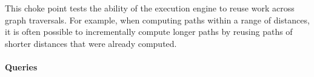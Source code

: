 
This choke point tests the ability of the execution engine to reuse work across
graph traversals. For example, when computing paths within a range of distances,
it is often possible to incrementally compute longer paths by reusing paths of
shorter distances that were already computed.


\paragraph{Queries}
{\raggedright
}